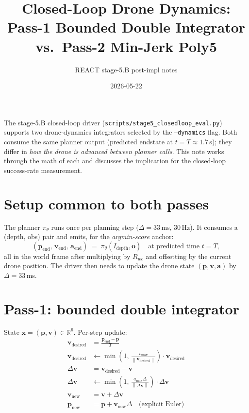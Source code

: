 \documentclass[11pt]{article}
\title{Closed-Loop Drone Dynamics:\\
       Pass-1 Bounded Double Integrator vs.\ Pass-2 Min-Jerk Poly5}
\author{REACT stage-5.B post-impl notes}
\date{2026-05-22}
\newcommand{\R}{\mathbb{R}}
\newcommand{\Norm}[1]{\left\lVert #1 \right\rVert}
\begin{document}
\maketitle

The stage-5.B closed-loop driver (\texttt{scripts/stage5\_closedloop\_eval.py})
supports two drone-dynamics integrators selected by the \texttt{--dynamics}
flag.  Both consume the same planner output (predicted endstate at
$t = T \approx 1.7\,$s); they differ in \emph{how the drone is advanced
between planner calls}.  This note works through the math of each and
discusses the implication for the closed-loop success-rate measurement.

\section{Setup common to both passes}

The planner $\pi_\theta$ runs once per planning step ($\Delta = 33\,$ms,
30\,Hz).  It consumes a (depth, obs) pair and emits, for the
\emph{argmin-score} anchor:
\begin{equation}\label{eq:planner-out}
(\bm{p}_{\text{end}},\, \bm{v}_{\text{end}},\, \bm{a}_{\text{end}}) \;=\; \pi_\theta(I_{\text{depth}}, \bm{o})
\quad\text{at predicted time } t = T,
\end{equation}
all in the world frame after multiplying by $R_{wc}$ and offsetting by
the current drone position.  The driver then needs to update the drone
state $(\bm{p}, \bm{v}, \bm{a})$ by $\Delta = 33\,$ms.

\section{Pass-1: bounded double integrator}

State $\bm{x} = (\bm{p}, \bm{v}) \in \R^6$.  Per-step update:
\begin{align}
\bm{v}_{\text{desired}}      &= \frac{\bm{p}_{\text{end}} - \bm{p}}{T} \label{eq:vdes}\\
\bm{v}_{\text{desired}}      &\leftarrow \min\!\left(1,\,\frac{v_{\max}}{\Norm{\bm{v}_{\text{desired}}}}\right) \cdot \bm{v}_{\text{desired}}\\
\Delta\bm{v}                  &= \bm{v}_{\text{desired}} - \bm{v}\\
\Delta\bm{v}                  &\leftarrow \min\!\left(1,\,\frac{a_{\max}\Delta}{\Norm{\Delta\bm{v}}}\right) \cdot \Delta\bm{v}\\
\bm{v}_{\text{new}}           &= \bm{v} + \Delta\bm{v}\\
\bm{p}_{\text{new}}           &= \bm{p} + \bm{v}_{\text{new}}\Delta \quad\text{(explicit Euler)} \label{eq:p-euler}
\end{align}
\end{document}

